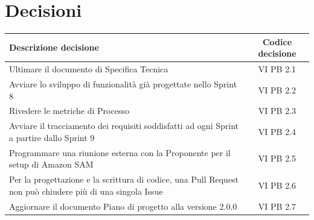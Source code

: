 \documentclass[a4paper,12pt]{article}
\newcommand{\ignoreglossary}{}
\begin{document}
\pagebreak
\section{Decisioni}
\begin{center}
\small
\renewcommand{\arraystretch}{1.2} 
\begin{tabular}{|p{}|c|}
\hline
\rowcolor{gray!60} 
\textbf{Descrizione decisione} & \textbf{Codice decisione} \\
\hline
\rowcolor{white}
Ultimare il documento di Specifica Tecnica & VI \ignoreglossary{PB} 2.1 \\
\hline
\rowcolor{gray!20}
Avviare lo sviluppo di funzionalità già progettate nello Sprint 8 & VI \ignoreglossary{PB} 2.2 \\
\hline
\rowcolor{white}
Rivedere le metriche di Processo & VI \ignoreglossary{PB} 2.3 \\
\hline
\rowcolor{gray!20}
Avviare il tracciamento dei requisiti soddisfatti ad ogni Sprint a partire dallo Sprint 9 & VI \ignoreglossary{PB} 2.4 \\
\hline
\rowcolor{white}
Programmare una riunione esterna con la Proponente per il setup di Amazon SAM & VI \ignoreglossary{PB} 2.5 \\
\hline
\rowcolor{gray!20}
Per la progettazione e la scrittura di codice, una Pull Request non può chiudere più di una singola Issue & VI \ignoreglossary{PB} 2.6 \\
\hline
\rowcolor{gray!20}
Aggiornare il documento Piano di progetto alla versione 2.0.0 & VI \ignoreglossary{PB} 2.7 \\
\hline
\end{tabular}
\end{center}
\pagebreak
\end{document}
